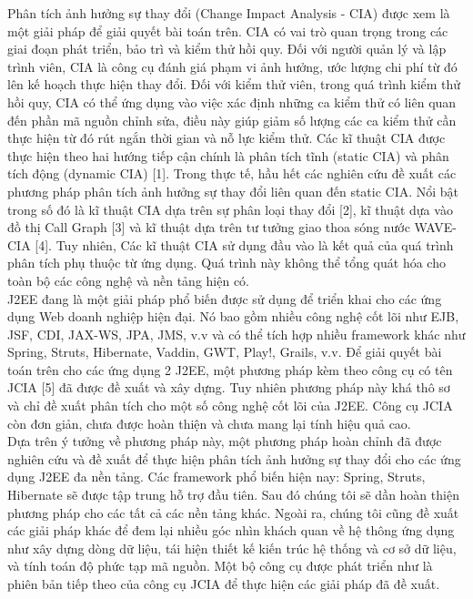 \documentclass[12pt]{report}
\begin{document}
Phân tích ảnh hưởng sự thay đổi (Change Impact Analysis - CIA) được xem là một
giải pháp để giải quyết bài toán trên. CIA có vai trò quan trọng trong các giai đoạn phát
triển, bảo trì và kiểm thử hồi quy. Đối với người quản lý và lập trình viên, CIA là công cụ
đánh giá phạm vi ảnh hưởng, ước lượng chi phí từ đó lên kế hoạch thực hiện thay đổi.
Đối với kiểm thử viên, trong quá trình kiểm thử hồi quy, CIA có thể ứng dụng vào việc
xác định những ca kiểm thử có liên quan đến phần mã nguồn chỉnh sửa, điều này giúp
giảm số lượng các ca kiểm thử cần thực hiện từ đó rút ngắn thời gian và nỗ lực kiểm thử.
Các kĩ thuật CIA được thực hiện theo hai hướng tiếp cận chính là phân tích tĩnh (static
CIA) và phân tích động (dynamic CIA) [1]. Trong thực tế, hầu hết các nghiên cứu đề xuất
các phương pháp phân tích ảnh hưởng sự thay đổi liên quan đến static CIA. Nổi bật trong
số đó là kĩ thuật CIA dựa trên sự phân loại thay đổi [2], kĩ thuật dựa vào đồ thị Call
Graph [3] và kĩ thuật dựa trên tư tưởng giao thoa sóng nước WAVE-CIA [4]. Tuy nhiên,
Các kĩ thuật CIA sử dụng đầu vào là kết quả của quá trình phân tích phụ thuộc từ ứng
dụng. Quá trình này không thể tổng quát hóa cho toàn bộ các công nghệ và nền tảng hiện
có.\\

J2EE đang là một giải pháp phổ biến được sử dụng để triển khai cho các ứng dụng
Web doanh nghiệp hiện đại. Nó bao gồm nhiều công nghệ cốt lõi như EJB, JSF, CDI,
JAX-WS, JPA, JMS, v.v và có thể tích hợp nhiều framework khác như Spring, Struts,
Hibernate, Vaddin, GWT, Play!, Grails, v.v. Để giải quyết bài toán trên cho các ứng dụng 
2
J2EE, một phương pháp kèm theo công cụ có tên JCIA [5] đã được đề xuất và xây dựng.
Tuy nhiên phương pháp này khá thô sơ và chỉ đề xuất phân tích cho một số công nghệ cốt
lõi của J2EE. Công cụ JCIA còn đơn giản, chưa được hoàn thiện và chưa mang lại tính
hiệu quả cao.\\

Dựa trên ý tưởng về phương pháp này, một phương pháp hoàn chỉnh đã được nghiên
cứu và đề xuất để thực hiện phân tích ảnh hưởng sự thay đổi cho các ứng dụng J2EE đa
nền tảng. Các framework phổ biến hiện nay: Spring, Struts, Hibernate sẽ được tập trung
hỗ trợ đầu tiên. Sau đó chúng tôi sẽ dần hoàn thiện phương pháp cho các tất cả các nền
tảng khác. Ngoài ra, chúng tôi cũng đề xuất các giải pháp khác để đem lại nhiều góc nhìn
khách quan về hệ thông ứng dụng như xây dựng dòng dữ liệu, tái hiện thiết kế kiến trúc
hệ thống và cơ sở dữ liệu, và tính toán độ phức tạp mã nguồn. Một bộ công cụ được phát
triển như là phiên bản tiếp theo của công cụ JCIA để thực hiện các giải pháp đã đề xuất.\\
\end{document}
